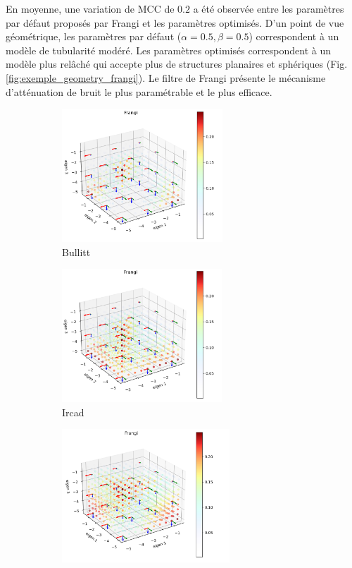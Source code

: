 En moyenne, une variation de MCC de $0.2$ a été observée entre les paramètres par défaut proposés par Frangi et les paramètres optimisés. D'un point de vue géométrique, les paramètres par défaut ($\alpha=0.5,\beta=0.5$) correspondent à un modèle de tubularité modéré. Les paramètres optimisés correspondent à un modèle plus relâché qui accepte plus de structures planaires et sphériques (Fig. \ref{fig:exemple_geometry_frangi}). Le filtre de Frangi présente le mécanisme d'atténuation de bruit le plus paramétrable et le plus efficace.

\begin{figure}[H]

  \begin{subfigure}[t]{0.45\textwidth}
    \includegraphics[height=5cm]{Images/Bullitt_Frangi_BP.png}
    \caption{Bullitt}
  \end{subfigure}
  \begin{subfigure}[t]{0.45\textwidth}
    \includegraphics[height=5cm]{Images/Ircad_Frangi_BP.png}
    \caption{Ircad}
  \end{subfigure}
  \begin{subfigure}[t]{0.45\textwidth}
    \includegraphics[height=5cm]{Images/Vascu_2_Frangi_BP.png}

\end{subfigure}
\end{figure}
